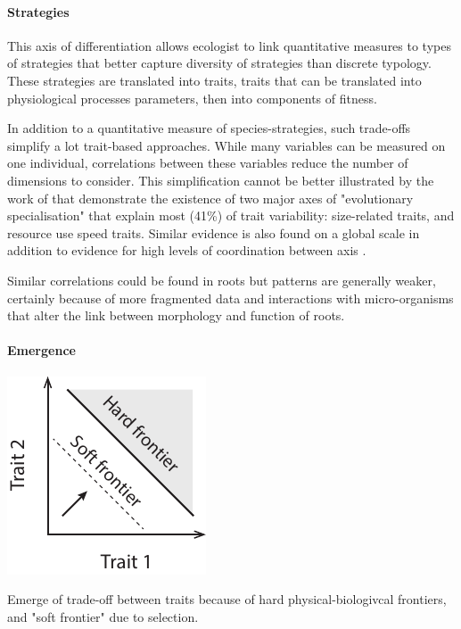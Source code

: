 \paragraph{Strategies}
This axis of differentiation allows ecologist to link quantitative measures to types of strategies that better capture diversity of strategies than discrete typology. These strategies are translated into traits, traits that can be translated into physiological processes parameters, then into components of fitness.

In addition to a quantitative measure of species-strategies, such trade-offs simplify a lot trait-based approaches. While many variables can be measured on one individual, correlations between these variables reduce the number of dimensions to consider. This simplification cannot be better illustrated by the work of \cite{diaz_plant_2004} that demonstrate the existence of two major axes of "evolutionary specialisation" that explain most (41\%) of trait variability: size-related traits, and resource use speed traits. Similar evidence is also found on a global scale in addition to evidence for high levels of coordination between axis \parencite{diaz_global_2016}.


Similar correlations could be found in roots \cite{ ryser_importance_1996, reich_world-wide_2014} but patterns are generally weaker, certainly because of more fragmented data and interactions with micro-organisms that alter the link between morphology and function of roots.

\paragraph{Emergence}


\begin{marginfigure}
    \includegraphics{./Figures/trade_off_emergence_m.pdf}
  \caption[Trade-off emergence]{Emerge of trade-off between traits because of hard physical-biologivcal frontiers, and "soft frontier" due to selection.}
  \label{fg:insurance}
\end{marginfigure}

